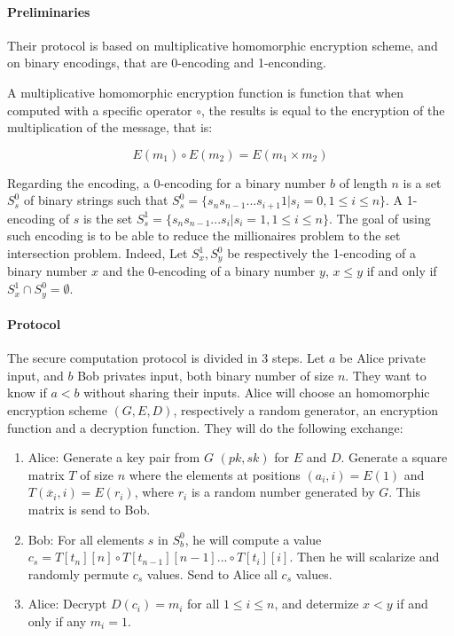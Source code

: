 \documentclass[11pt,a4paper]{article}
\begin{document}
\paragraph{Preliminaries}


Their protocol is based on multiplicative homomorphic encryption
scheme, and on binary encodings, that are 0-encoding and 1-enconding.

A multiplicative homomorphic encryption function is function
that when computed with a specific operator $\circ$, the results is equal
to the encryption of the multiplication of the message, that is:

$$
E(m_1) \circ E(m_2) = E(m_1 \times m_2)
$$

Regarding the encoding, a 0-encoding for a binary number $b$ of length
$n$ is a set $S_s^0$ of binary strings such that $S_s^0 = \{s_n s_{n-1}...s_{i+1}
1|s_i=0,1 \le i \le n\}$. A 1-encoding of $s$ is the set
$S_s^1 = \{s_n s_{n-1}...s_{i}|s_i=1,1 \le i \le n\}$. The goal
of using such encoding is to be able to reduce the millionaires problem
to the set intersection problem. Indeed, Let $S_x^1, S_y^0$ be
respectively the 1-encoding of a binary number $x$ and the 0-encoding
of a binary number $y$, $x \le y$ if and only if $S_x^1 \cap S_y^0 = \emptyset$.

\paragraph{Protocol} The secure computation protocol is divided
in 3 steps. Let $a$ be Alice private input, and $b$ Bob privates input,
both binary number of size $n$.
They want to know if $a < b$ without
sharing their inputs. Alice will choose an homomorphic encryption
scheme $(G, E, D)$, respectively a random generator, an encryption function
and a decryption function.
They will do the following exchange:
\begin{enumerate}
    \item  Alice:
    Generate a key pair from $G$ $(pk, sk)$ for $E$ and $D$.
    Generate a square matrix $T$ of size $n$ where the elements
    at positions $(a_i, i) = E(1)$ and $T(\overline{x}_i, i) = E(r_i)$,
    where $r_i$ is a random number generated by $G$. This matrix
    is send to Bob.
    \item Bob: For all elements $s$ in $S_b^0$, he will compute
    a value $c_s = T[t_n][n] \circ T[t_{n-1}][n-1]...\circ T[t_i][i]$.
    Then he will scalarize and randomly permute $c_s$ values.
    Send to Alice all $c_s$ values.
    \item Alice: Decrypt $D(c_i) = m_i$ for all $1 \le i \le n$, and
    determize $x < y$ if and only if any $m_i = 1$.
\end{enumerate}
\end{document}
